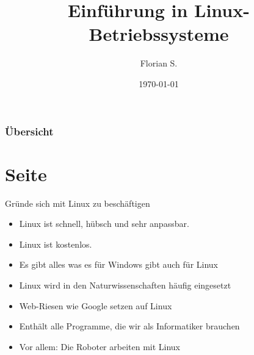 \documentclass{beamer}
\title{Einführung in Linux-Betriebssysteme}
\author{Florian S.}
\institute{RoboCup-AG - UHH}
\date{\today}
\begin{document}
\begin{frame}
\titlepage
\end{frame}


\begin{frame}
\frametitle{Übersicht}
\tableofcontents
\end{frame}


\section{Seite}
\begin{frame}{Gründe sich mit Linux zu beschäftigen}
\begin{itemize}
	\item Linux ist schnell, hübsch und sehr anpassbar.
	\item Linux ist kostenlos.
	\item Es gibt alles was es für Windows gibt auch für Linux
	\item Linux wird in den Naturwissenschaften häufig eingesetzt
	\item Web-Riesen wie Google setzen auf Linux
	\item Enthält alle Programme, die wir als Informatiker brauchen
	\item Vor allem: Die Roboter arbeiten mit Linux
\end{itemize}
\end{frame}


%

%
\end{document}
